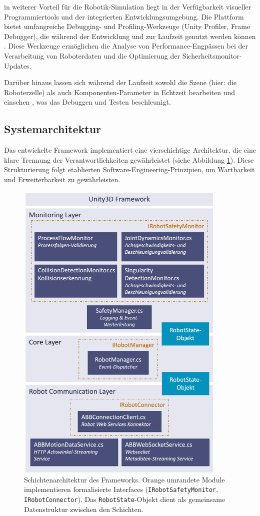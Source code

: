 \noindent
in weiterer Vorteil für die Robotik-Simulation liegt in der
Verfügbarkeit visueller Programmiertools und der integrierten
Entwicklungsumgebung. Die Plattform bietet umfangreiche Debugging- und
Profiling-Werkzeuge (Unity Profiler, Frame Debugger), die während der
Entwicklung und zur Laufzeit genutzt werden können
. Diese Werkzeuge ermöglichen die
Analyse von Performance-Engpässen bei der Verarbeitung von Roboterdaten und die
Optimierung der Sicherheitsmonitor-Updates.

Darüber hinaus lassen sich während der Laufzeit sowohl die Szene (hier: die
Roboterzelle) als auch Komponenten-Parameter in Echtzeit bearbeiten und
einsehen , was das Debuggen und Testen
beschleunigt.


\subsection{Systemarchitektur}

Das entwickelte Framework implementiert eine vierschichtige Architektur, die
eine klare Trennung der Verantwortlichkeiten gewährleistet (siehe Abbildung
\ref{fig:layer_architecture}). Diese Strukturierung folgt etablierten
Software-Engineering-Prinzipien, um Wartbarkeit und Erweiterbarkeit zu
gewährleisten.

\begin{figure}[H]
	\centering
	\includegraphics[width=10cm]{figures/LayerArchitekturFramework.png}
	\caption{Schichtenarchitektur des Frameworks. Orange umrandete Module implementieren formalisierte Interfaces (\texttt{IRobotSafetyMonitor}, \texttt{IRobotConnector}). Das \texttt{RobotState}-Objekt dient als gemeinsame Datenstruktur zwischen den Schichten.}
	\label{fig:layer_architecture}
\end{figure}

